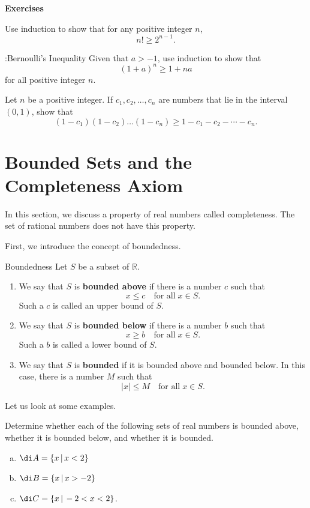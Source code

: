 \vp
\noindent
{\bf \large Exercises  \thesection}
\setcounter{myquestion}{1}

 \begin{question}[label=Q23020502]{\themyquestion}
Use induction to show that for any positive integer $n$,
 \[n!\geq 2^{n-1}.\]
 \end{question}
\atc


\begin{question}[label=Q23020501]{\themyquestion:\;Bernoulli's Inequality}
 Given that $a>-1$, use induction to show that 
 \[(1+a)^n\geq 1+na\]for all positive integer $n$.
 \end{question}
 \atc
\begin{question}{\themyquestion} 
Let $n$ be a positive integer.  If $c_1, c_2, \ldots, c_n$ are numbers that lie in the interval $(0,1)$, show that
\[(1-c_1)(1-c_2)\ldots (1-c_n)\geq 1-c_1-c_2-\cdots-c_n.\]
\end{question}
  
\vp
\section{Bounded Sets and the Completeness Axiom}
\label{sec1.3}

In this section, we discuss a property of real numbers called completeness. The set of rational numbers does not have this property.  


First, we introduce the concept of boundedness.
\begin{definition}{Boundedness}
Let $S$ be a subset of $\mathbb{R}$.
\begin{enumerate}[1.]
\item
We say that $S$ is {\bf bounded above} if there is a number $c$ such that 
\[ x\leq c\quad \text{for all}\; x\in S.\]
Such a $c$ is called an upper bound of $S$.
\item We say that $S$ is {\bf bounded below} if there is a number $b$ such that
\[x\geq b\quad \text{for all}\; x\in S.\]
Such a $b$ is called a lower bound of $S$.
\item We say that $S$ is {\bf bounded} if it is bounded above and bounded below. In this case, there is a number $M$ such that
\[|x|\leq M\quad \text{for all}\; x\in S.\]
\end{enumerate}
\end{definition}

Let us look at some examples.
\begin{example}[label=23020705]{}
Determine whether each of the following sets of real numbers is bounded above, whether it is bounded below, and whether it is bounded.
\begin{enumerate}[(a)]
\item 
$\di A=\left\{x\,|\, x<2\right\}$
\item  $\di B=\left\{x\,|\, x>-2\right\}$
\item $\di C=\left\{x\,|\, -2<x<2\right\}$. 
\end{enumerate}
\end{example}

